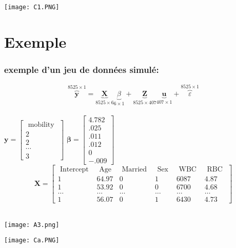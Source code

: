 \documentclass[unknownkeysallowed]{beamer}
\begin{document}
\begin{frame}
\frametitle{}
 \texttt{[image: C1.PNG]}
\end{frame}

\section{Exemple}
\begin{frame}
\frametitle{exemple d'un jeu de données simulé:}
   
    $$
\overbrace{\mathbf{y}}^{8525 \times 1}=\underbrace{\mathbf{X}}_{8525 \times 6}\underbrace{\beta}_{6 \times 1}+ \underbrace{\mathbf{Z}}_{8525 \times 407}\underbrace{\boldsymbol{u}}_{407 \times 1}+\overbrace{\varepsilon}^{8525 \times 1}
$$\\

$\mathbf{y}=\left[\begin{array}{l}\text { mobility } \\ 2 \\ 2 \\ \cdots \\ 3\end{array}\right]$ \hspace{2.8cm}
$\boldsymbol{\beta}=\left[\begin{array}{c}
4.782 \\
.025 \\
.011 \\
.012 \\
0 \\
-.009
\end{array}\right]$\\
$$\mathbf{X}=\left[\begin{array}{llllll}
\text { Intercept } & \text { Age } & \text { Married } & \text { Sex } & \text { WBC } & \text { RBC } \\
1 & 64.97 & 0 & 1 & 6087 & 4.87 \\
1 & 53.92 & 0 & 0 & 6700 & 4.68 \\
\ldots & \ldots & \ldots & \ldots & \ldots & \ldots \\
1 & 56.07 & 0 & 1 & 6430 & 4.73
\end{array}\right]$$\\

\end{frame}


\begin{frame}
\texttt{[image: A3.png]}
\end{frame}


\begin{frame}
\texttt{[image: Ca.PNG]}
\end{frame}
\end{document}
